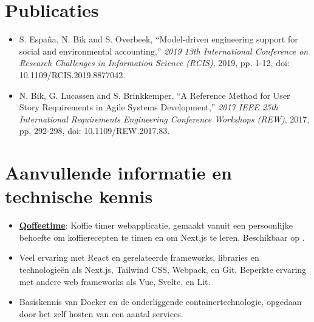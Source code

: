 \documentclass[10pt]{article}
\begin{document}
\section{Publicaties}
\label{sec:pubs}

\begin{itemize}
      \item S. España, N. Bik and S. Overbeek, \enquote{Model-driven engineering
                  support for social and environmental accounting,} \textit{2019 13th
                  International Conference on Research Challenges in Information Science (RCIS)},
            2019, pp. 1-12, doi:\\ 10.1109/RCIS.2019.8877042.
      \item N. Bik, G. Lucassen and S. Brinkkemper, \enquote{A Reference Method for
                  User Story Requirements in Agile Systems Development,} \textit{2017 IEEE 25th
                  International Requirements Engineering Conference Workshops (REW)}, 2017, pp.
            292-298, doi: 10.1109/REW.2017.83.
\end{itemize}

\section{Aanvullende informatie en technische kennis}
\label{sec:other}

\begin{itemize}
      \item \textbf{\underline{Qoffeetime}}: Koffie timer webapplicatie, gemaakt
            vanuit een persoonlijke behoefte om koffierecepten te timen en om Next.js te
            leren. Beschikbaar op .
      \item Veel ervaring met React en gerelateerde frameworks, libraries en
            technologieën als Next.js, Tailwind CSS, Webpack, en Git. Beperkte ervaring met
            andere web frameworks als Vue, Svelte, en Lit.
      \item Basiskennis van Docker en de onderliggende containertechnologie, opgedaan
            door het zelf hosten van een aantal services.
\end{itemize}
\end{document}
